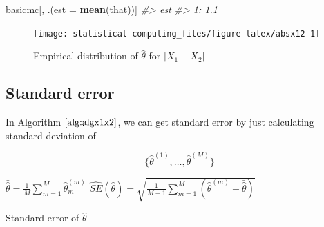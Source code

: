 \documentclass[]{book}
\newenvironment{Shaded}{\begin{snugshade}}{\end{snugshade}}
\newcommand{\CommentTok}[1]{\textcolor[rgb]{0.56,0.35,0.01}{\textit{#1}}}
\newcommand{\DataTypeTok}[1]{\textcolor[rgb]{0.13,0.29,0.53}{#1}}
\newcommand{\DecValTok}[1]{\textcolor[rgb]{0.00,0.00,0.81}{#1}}
\newcommand{\FloatTok}[1]{\textcolor[rgb]{0.00,0.00,0.81}{#1}}
\newcommand{\KeywordTok}[1]{\textcolor[rgb]{0.13,0.29,0.53}{\textbf{#1}}}
\newcommand{\NormalTok}[1]{#1}
\newcommand{\OperatorTok}[1]{\textcolor[rgb]{0.81,0.36,0.00}{\textbf{#1}}}
\newcommand{\StringTok}[1]{\textcolor[rgb]{0.31,0.60,0.02}{#1}}
\theoremstyle{definition}
\theoremstyle{definition}
\theoremstyle{definition}
\theoremstyle{remark}
\begin{document}
\begin{Shaded}
\begin{Highlighting}[]
\NormalTok{basicmc[,}
\NormalTok{        .(}\DataTypeTok{est =} \KeywordTok{mean}\NormalTok{(that))]}
\CommentTok{#>    est}
\CommentTok{#> 1: 1.1}
\end{Highlighting}
\end{Shaded}

\begin{Shaded}
\end{Shaded}

\begin{figure}[H]

{\centering \texttt{[image: statistical-computing\_files/figure-latex/absx12-1]} 

}

\caption{Empirical distribution of $\hat\theta$ for $\lvert X_1 - X_2 \rvert$}\label{fig:absx12}
\end{figure}

\hypertarget{standard-error}{%
\subsection{Standard error}\label{standard-error}}

In Algorithm \(\ref{alg:algx1x2}\), we can get standard error by just calculating standard deviation of

\[\{ \hat\theta^{(1)}, \ldots, \hat\theta^{(M)} \}\]

\begin{algorithm}[H] \label{alg:algmcse}
  \SetAlgoLined
  $\bar{\hat\theta} = \frac{1}{M} \sum\limits_{m = 1}^M\hat\theta_m^{(m)}$\;
  $\widehat{SE}(\hat\theta) = \sqrt{\frac{1}{M - 1}\sum\limits_{m = 1}^M(\hat\theta^{(m)} - \bar{\hat\theta})}$\;
  \caption{Standard error of $\hat\theta$}
\end{algorithm}
\end{document}
